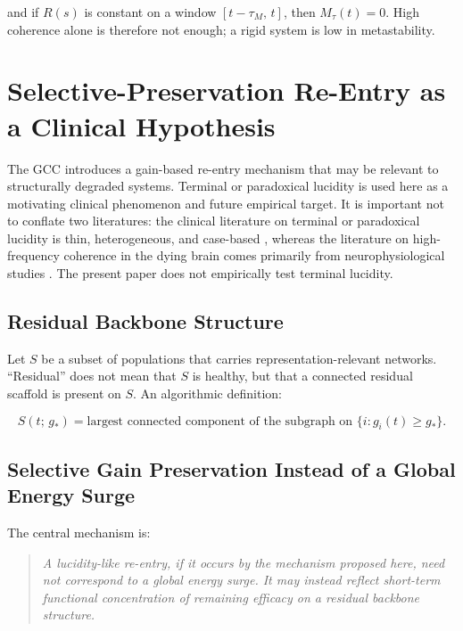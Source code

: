 \documentclass[11pt,a4paper]{article}
\theoremstyle{plain}
\theoremstyle{definition}
\theoremstyle{remark}
\newcommand{\Mtau}{M_{\tau}}
\begin{document}
and if $R(s)$ is constant on a window $[t-\tau_M,\,t]$, then $\Mtau(t) = 0$. High coherence alone is therefore not enough; a rigid system is low in metastability.


\section{Selective-Preservation Re-Entry as a Clinical Hypothesis}
\label{sec:TL}

The GCC introduces a gain-based re-entry mechanism that may be relevant to structurally degraded systems. Terminal or paradoxical lucidity is used here as a motivating clinical phenomenon and future empirical target. It is important not to conflate two literatures: the clinical literature on terminal or paradoxical lucidity is thin, heterogeneous, and case-based \citep{nahm2012,gilmore2023,batthyany2017}, whereas the literature on high-frequency coherence in the dying brain comes primarily from neurophysiological studies \citep{borjigin2013,xu2023}. The present paper does not empirically test terminal lucidity.

\subsection{Residual Backbone Structure}

Let $S$ be a subset of populations that carries representation-relevant networks. ``Residual'' does not mean that $S$ is healthy, but that a connected residual scaffold is present on $S$. An algorithmic definition:

\begin{equation}
\label{eq:backbone}
S(t;\,g_*) = \text{largest connected component of the subgraph on } \{i : g_i(t) \geq g_*\}.
\end{equation}

\subsection{Selective Gain Preservation Instead of a Global Energy Surge}

The central mechanism is:

\begin{quote}
\itshape
A lucidity-like re-entry, if it occurs by the mechanism proposed here, need not correspond to a global energy surge. It may instead reflect short-term functional concentration of remaining efficacy on a residual backbone structure.
\end{quote}
\end{document}
